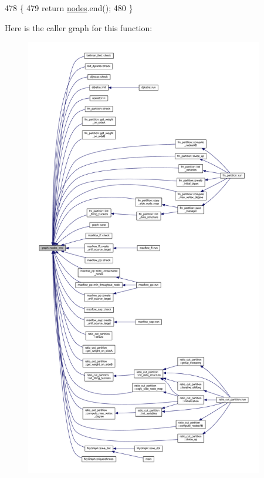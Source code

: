 \begin{DoxyCode}
478 \{
479     \textcolor{keywordflow}{return} \mbox{\hyperlink{classgraph_a4ea0592e8eb7c26c5abad24546907726}{nodes}}.end();
480 \}
\end{DoxyCode}
Here is the caller graph for this function\+:
\nopagebreak
\begin{figure}[H]
\begin{center}
\leavevmode
\includegraphics[height=550pt]{classgraph_abbf9c0cb5629e98e1142254911238173_icgraph}
\end{center}
\end{figure}
\mbox{\label{classgraph_aa4fcbe7bf572dc800068873ccfb4d95a}} 
